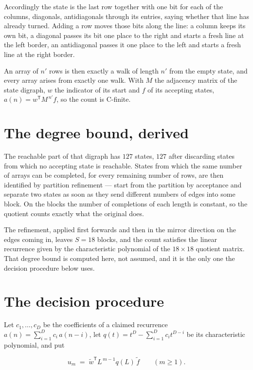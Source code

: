 \documentclass[11pt]{article}
\theoremstyle{definition}
\begin{document}
Accordingly the state is the last row together with one bit for each of the columns, diagonals, antidiagonals through its entries, saying whether that line has already turned. Adding a row moves those bits along the line: a column keeps its own bit, a diagonal passes its bit one place to the right and starts a fresh line at the left border, an antidiagonal passes it one place to the left and starts a fresh line at the right border.

An array of $n'$ rows is then exactly a walk of length $n'$ from the empty state, and every array arises from exactly one walk. With $M$ the adjacency matrix of the state digraph, $w$ the indicator of its start and $f$ of its accepting states, $a(n) = w^{\mathsf T}M^{\,n'}f$, so the count is C-finite.

\section{The degree bound, derived}

The reachable part of that digraph has $127$ states, $127$ after discarding states from which no accepting state is reachable. States from which the same number of arrays can be completed, for every remaining number of rows, are then identified by partition refinement --- start from the partition by acceptance and separate two states as soon as they send different numbers of edges into some block. On the blocks the number of completions of each length is constant, so the quotient counts exactly what the original does.

The refinement, applied first forwards and then in the mirror direction on the edges coming in, leaves $S = 18$ blocks, and the count satisfies the linear recurrence given by the characteristic polynomial of the $18 \times 18$ quotient matrix. That degree bound is computed here, not assumed, and it is the only one the decision procedure below uses.

\section{The decision procedure}

Let $c_1,\dots,c_D$ be the coefficients of a claimed recurrence $a(n) = \sum_{i=1}^{D} c_i\,a(n-i)$, let $q(t) = t^{D} - \sum_{i=1}^{D} c_i t^{D-i}$ be its characteristic polynomial, and put

\[u_m \;=\; \tilde w^{\mathsf T} L^{\,m-1} q(L)\,\tilde f \qquad (m \ge 1).\]
\end{document}

